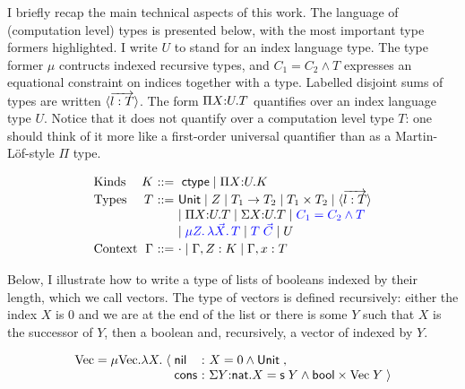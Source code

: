 \documentclass{article}
\begin{document}
I briefly recap the main technical aspects of this work. The
language of (computation level) types is presented below, with the
most important type formers highlighted. I write $U$ to stand for an index
language type. The type former $\mu$ contructs indexed recursive types, and $C_1 = C_2
\wedge T$ expresses an equational constraint on indices together with
a type. Labelled disjoint sums of types are written $\langle \overrightarrow{l :
    T} \rangle$. The form $\Pi X{:}U. T$ quantifies over an index language
type $U$. Notice that it does not quantify over a computation level
type $T$: one should think of it more like a first-order universal
quantifier than as a Martin-L\"of-style $\Pi$ type. 

\[
\begin{array}{l@{~}r@{~}c@{~}l}
%
\mbox{Kinds} & K & \bnfas & \ctype \bnfalt \pibox X U K \\

\mbox{Types} & T  & \bnfas & 
        \m{Unit} 
\bnfalt Z 
\bnfalt T_1 \arrow T_2   
\bnfalt  T_1 \times T_2 
\bnfalt \dsum{\wvec{l : T}} 
\\
& & &   
\bnfalt \pibox X U T 
\bnfalt \sigmabox X U T 
\bnfalt {\color{blue} C_1 = C_2 \andalso T}
\\
&&&    
 \bnfalt {\color{blue} \mu Z.\,\mlam {\vec X}  T}
 \bnfalt {\color{blue} T\;{\vec C} }
\bnfalt U
\\[2pt] %
\mbox{Context} & \Gamma & \bnfas & \cdot \bnfalt \Gamma, Z:K \bnfalt \Gamma, x:T
\end{array}
\]

Below, I illustrate how to write a type of lists of booleans indexed by their
length, which we call vectors. The type of vectors is defined
recursively: either the index $X$ is 0 and we are at the end of the
list or there is some $Y$ such that $X$ is the successor of $Y$, then
a boolean and, recursively, a vector of indexed by $Y$.

\[
\begin{array}{r@{\;}c@{\;}l@{~:~}l}
%
\text{Vec} = \mu \text{Vec}. \lambda X. & \langle & \m{nil} &  X = 0 \andalso \tunit\;, \\
&  & \m{cons} &  \sigmabox Y \nat X = \m{s}\;Y \andalso \m{bool} \times \text{Vec}\;Y  \;\rangle 
\end{array}
\]
\end{document}
